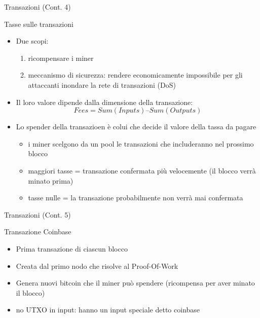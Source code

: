 \documentclass{beamer}
\begin{document}
  \begin{frame}{Transazioni (Cont. 4)}
    \begin{block}{Tasse sulle transazioni}
      \begin{itemize}
        \item Due scopi:
        \begin{enumerate}
          \item ricompensare i miner
          \item meccanismo di sicurezza: rendere economicamente impossibile per gli attaccanti inondare la rete di transazioni (DoS) 
        \end{enumerate}
        \item Il loro valore dipende dalla dimensione della transazione: 
        \[ Fees = Sum(Inputs)–Sum(Outputs) \] 
        \item Lo spender della transazioen è colui che decide il valore della tassa da pagare
        \begin{itemize}
            \item i miner scelgono da un pool le transazioni che includeranno nel prossimo blocco
            \item maggiori tasse = transazione confermata più velocemente (il blocco verrà minato prima) 
            \item tasse nulle = la transazione probabilmente non verrà mai confermata
        \end{itemize}
      \end{itemize}
    \end{block}
  \end{frame}





  \begin{frame}{Transazioni (Cont. 5)}
    \begin{block}{Transazione Coinbase}
      \begin{itemize}
        \item Prima transazione di ciascun blocco
        \item Creata dal primo nodo che risolve al Proof-Of-Work
        \item Genera nuovi bitcoin che il miner può spendere (ricompensa per aver minato il blocco)
        \item no UTXO in input: hanno un input speciale detto coinbase
      \end{itemize}
    \end{block}
  \end{frame}
\end{document}
